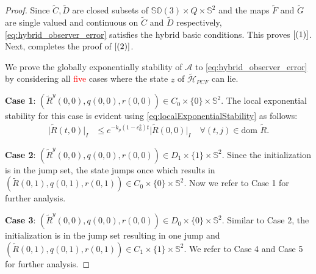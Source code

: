 \documentclass{article}
\newcommand{\dom}{\text{dom }}
\newcommand{\SOthree}{\mathbb{SO}(3)}
\newcommand{\Rtilde}{\tilde{R}}
\newcommand{\normSOthree}[1]{{{\vert}#1 {\vert}_I}}
\newcommand{\expo}[1]{e^{#1}}
\begin{document}
    \begin{proof}
         Since $\tilde{C}, \tilde{D}$ are closed subsets of ${\SOthree\times Q \times \mathbb{S}^2}$ and the maps $\tilde{F}$ and $\tilde{G}$ are single valued and continuous on $\tilde{C}$ and $\tilde{D}$ respectively, \eqref{eq:hybrid_observer_error} satisfies the hybrid basic conditions. This proves $\eqref{(1)}$. Next, \cite[Proposition 6.10]{hybridDynamicalSystems} completes the proof of $\eqref{(2)}$. 
    
  We prove the globally exponentially stability of $\mathcal{A}$ to \eqref{eq:hybrid_observer_error} by considering all \textcolor{red}{five} cases where the state $z$ of $\tilde{\mathcal{H}}_{PCF}$ can lie. 

\textbf{Case 1}: ${(\Rtilde^y(0,0), q(0,0), r(0,0))} \in C_0\times \{0\}\times\mathbb{S}^2$. The local exponential stability for this case is evident using \eqref{eq:localExponentialStability} as follows:
\begin{align}\label{eq:C0bounds}
    \normSOthree{\Rtilde(t,0)} &\leq \expo{-k_p(1-c_0^2)t}\normSOthree{\Rtilde(0,0)} \quad \forall (t,j) \in \dom\Rtilde.
\end{align}

    \textbf{Case 2}: ${(\Rtilde^y(0,0), q(0,0), r(0,0))}\in D_1\times\{1\}\times\mathbb{S}^2$. Since the initialization is in the jump set, the state jumps once which results in ${(\Rtilde(0,1), q(0,1), r(0,1))}\in C_0\times \{0\}\times \mathbb{S}^2$. Now we refer to Case 1 for further analysis.

    \textbf{Case 3}: ${(\Rtilde^y(0,0), q(0,0), r(0,0))}\in D_0\times\{0\} \times \mathbb{S}^2$. Similar to Case 2, the initialization is in the jump set resulting in one jump and ${(\Rtilde(0,1), q(0,1), r(0,1))}\in C_1\times\{1\}\times \mathbb{S}^2$. We refer to Case 4 and Case 5 for further analysis.


\end{proof}
\end{document}
